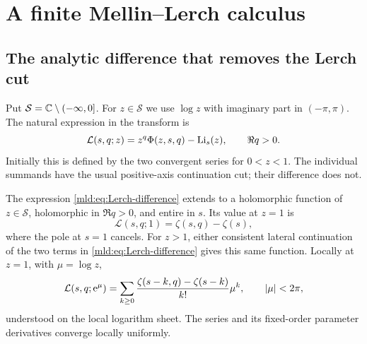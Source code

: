 \section{A finite Mellin--Lerch calculus}\label{mld:sec:mellin}

\subsection{The analytic difference that removes the Lerch cut}

Put $\mathcal S=\mathbb C\setminus(-\infty,0]$. For $z\in\mathcal S$ we use $\log z$ with imaginary part in $(-\pi,\pi)$. The natural expression in the transform is
\begin{equation}\label{mld:eq:Lerch-difference}
 \mathcal L(s,q;z)=z^q\Phi(z,s,q)-\operatorname{Li}_s(z),\qquad \Re q>0.
\end{equation}
Initially this is defined by the two convergent series for $0<z<1$. The individual summands have the usual positive-axis continuation cut; their difference does not.

\begin{lemma}\label{mld:lem:Lerch-cancellation}
The expression \eqref{mld:eq:Lerch-difference} extends to a holomorphic function of $z\in\mathcal S$, holomorphic in $\Re q>0$, and entire in $s$. Its value at $z=1$ is
\begin{equation}\label{mld:eq:Lerch-unit}
 \mathcal L(s,q;1)=\zeta(s,q)-\zeta(s),
\end{equation}
where the pole at $s=1$ cancels. For $z>1$, either consistent lateral continuation of the two terms in \eqref{mld:eq:Lerch-difference} gives this same function. Locally at $z=1$, with $\mu=\log z$,
\begin{equation}\label{mld:eq:Lerch-germ}
 \mathcal L(s,q;\mathrm e^\mu)
 =\sum_{k\ge0}\frac{\zeta(s-k,q)-\zeta(s-k)}{k!}\mu^k,
 \qquad |\mu|<2\pi,
\end{equation}
understood on the local logarithm sheet. The series and its fixed-order parameter derivatives converge locally uniformly.
\end{lemma}

